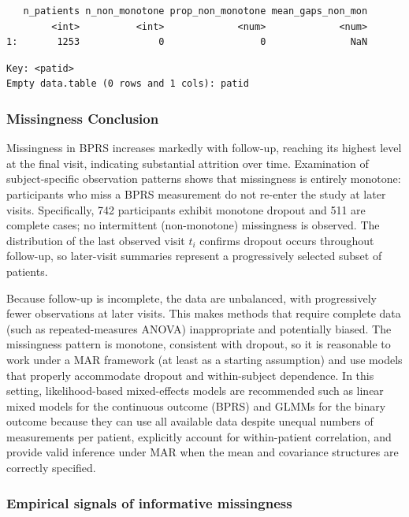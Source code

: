 \documentclass[
  11pt,
  letterpaper,
  DIV=11,
  numbers=noendperiod]{scrartcl}
\begin{document}
\begin{verbatim}
   n_patients n_non_monotone prop_non_monotone mean_gaps_non_mon
        <int>          <int>             <num>             <num>
1:       1253              0                 0               NaN
\end{verbatim}

\begin{verbatim}
Key: <patid>
Empty data.table (0 rows and 1 cols): patid
\end{verbatim}

\subsubsection{Missingness Conclusion}\label{missingness-conclusion}

Missingness in BPRS increases markedly with follow-up, reaching its
highest level at the final visit, indicating substantial attrition over
time. Examination of subject-specific observation patterns shows that
missingness is entirely monotone: participants who miss a BPRS
measurement do not re-enter the study at later visits. Specifically, 742
participants exhibit monotone dropout and 511 are complete cases; no
intermittent (non-monotone) missingness is observed. The distribution of
the last observed visit \(t_i\) confirms dropout occurs throughout
follow-up, so later-visit summaries represent a progressively selected
subset of patients.

Because follow-up is incomplete, the data are unbalanced, with
progressively fewer observations at later visits. This makes methods
that require complete data (such as repeated-measures ANOVA)
inappropriate and potentially biased. The missingness pattern is
monotone, consistent with dropout, so it is reasonable to work under a
MAR framework (at least as a starting assumption) and use models that
properly accommodate dropout and within-subject dependence. In this
setting, likelihood-based mixed-effects models are recommended such as
linear mixed models for the continuous outcome (BPRS) and GLMMs for the
binary outcome because they can use all available data despite unequal
numbers of measurements per patient, explicitly account for
within-patient correlation, and provide valid inference under MAR when
the mean and covariance structures are correctly specified.

\subsubsection{Empirical signals of informative
missingness}\label{empirical-signals-of-informative-missingness}
\end{document}
